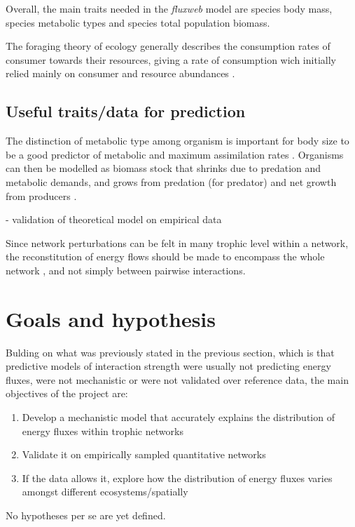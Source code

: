 \documentclass[english,12pt]{article}
\begin{document}
Overall, the main traits needed in the \emph{fluxweb} model are species body mass, species metabolic types and species total population biomass.

The foraging theory of ecology generally describes the consumption rates of consumer towards their resources, giving a rate of consumption wich initially relied mainly on consumer and resource abundances \citep{brose2008}. 

\subsection{Useful traits/data for prediction}
The distinction of metabolic type among organism is important for body size to be a good predictor of metabolic and maximum assimilation rates \citep{Williams2006HomYod}. Organisms can then be modelled as biomass stock that shrinks due to predation and metabolic demands, and grows from predation (for predator) and net growth from producers \citep{Williams2006HomYod}. 

- validation of theoretical model on empirical data


Since network perturbations can be felt in many trophic level within a network, the reconstitution of energy flows should be made to encompass the whole network \citep{Delmas2017SimBio}, and not simply between pairwise interactions.


\section{Goals and hypothesis}
Bulding on what was previously stated in the previous section, which is that predictive models of interaction strength were usually not predicting energy fluxes, were not mechanistic or were not validated over reference data, the main objectives of the project are:
\begin{enumerate}
    \item Develop a mechanistic model that accurately explains the distribution of energy fluxes within trophic networks
    \item Validate it on empirically sampled quantitative networks 
    \item If the data allows it, explore how the distribution of energy fluxes varies amongst different ecosystems/spatially
\end{enumerate}

No hypotheses per se are yet defined.
\end{document}
